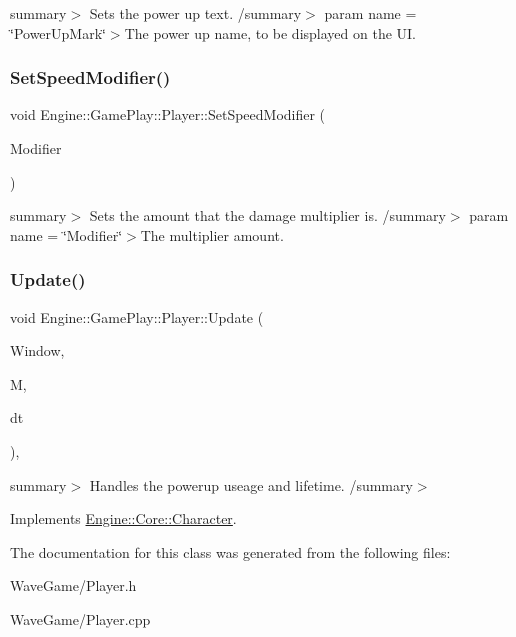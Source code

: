 summary$>$ Sets the power up text. /summary$>$ param name = \char`\"{}\+Power\+Up\+Mark\char`\"{}$>$The power up name, to be displayed on the UI.\mbox{\label{class_engine_1_1_game_play_1_1_player_a5a67ed64c644e9ebea338feb0db0ac98}} 
\subsubsection{\texorpdfstring{Set\+Speed\+Modifier()}{SetSpeedModifier()}}
{\footnotesize\ttfamily void Engine\+::\+Game\+Play\+::\+Player\+::\+Set\+Speed\+Modifier (\begin{DoxyParamCaption}\item[{float}]{Modifier }\end{DoxyParamCaption})}

summary$>$ Sets the amount that the damage multiplier is. /summary$>$ param name = \char`\"{}\+Modifier\char`\"{}$>$The multiplier amount.\mbox{\label{class_engine_1_1_game_play_1_1_player_a06c682bf13c20fb2390807ec681b0121}} 
\subsubsection{\texorpdfstring{Update()}{Update()}}
{\footnotesize\ttfamily void Engine\+::\+Game\+Play\+::\+Player\+::\+Update (\begin{DoxyParamCaption}\item[{Render\+Window $\ast$}]{Window,  }\item[{\hyperlink{class_engine_1_1_core_1_1_map}{Map}}]{M,  }\item[{float}]{dt }\end{DoxyParamCaption})\hspace{0.3cm}{\ttfamily [override]}, {\ttfamily [virtual]}}

summary$>$ Handles the powerup useage and lifetime. /summary$>$ 

Implements \hyperlink{class_engine_1_1_core_1_1_character}{Engine\+::\+Core\+::\+Character}.



The documentation for this class was generated from the following files\+:\begin{DoxyCompactItemize}
\item 
Wave\+Game/Player.\+h\item 
Wave\+Game/Player.\+cpp\end{DoxyCompactItemize}
